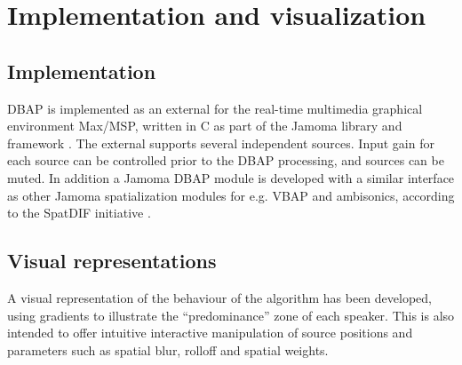 \documentclass[twoside,10pt]{article}
\begin{document}



%
%

\section{Implementation and visualization}

\subsection{Implementation}
\label{sec:implementation}

DBAP is implemented as an external for the real-time multimedia graphical environment Max/MSP, written in C as part of the Jamoma library and framework \cite{Place:2006jamoma}. The external supports several independent sources. Input gain for each source can be controlled prior to the DBAP processing, and sources can be muted.  In addition a Jamoma DBAP module is developed with a similar interface as other Jamoma spatialization modules for e.g. VBAP and ambisonics, according to the SpatDIF initiative \cite{Peters:2008spatdif}.



\subsection{Visual representations}
\label{sec:visual_representation}


A visual representation of the behaviour of the algorithm has been developed, using gradients to illustrate the ``predominance'' zone of each speaker. This is also intended to offer intuitive interactive manipulation of source positions and parameters such as spatial blur, rolloff and spatial weights.
\end{document}
